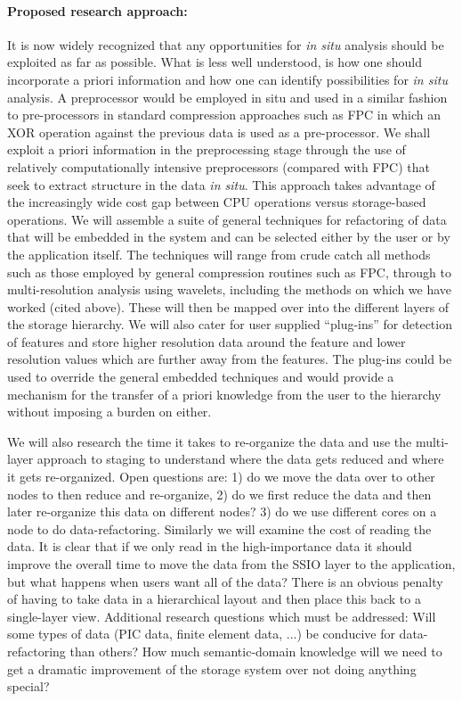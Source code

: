 \paragraph{Proposed research approach:} It is now widely recognized that any
opportunities for {\em in situ} analysis should be exploited as far as
possible. What is less well understood, is how one should incorporate a priori
information and how one can identify possibilities for {\em in situ} analysis.
A preprocessor would be employed in situ and used in a similar fashion to
pre-processors in standard compression approaches such as FPC
\cite{BurtscherFPC} in which an XOR operation against the previous data is used
as a pre-processor.  We shall exploit a priori information in the preprocessing
stage through the use of relatively computationally intensive preprocessors
(compared with FPC) that seek to extract structure in the data {\em in situ}.
This approach takes advantage of the increasingly wide cost gap between CPU
operations versus storage-based operations. 
We will assemble a suite of general techniques for refactoring of data that
will be embedded in the system and can be selected either by the user or by the
application itself. The techniques will range from crude catch all methods such
as those employed by general compression routines such as FPC, through to
multi-resolution analysis using wavelets, including the methods on which we
have worked (cited above).  These will then be mapped over into the different
layers of the storage hierarchy.  We will also cater for user supplied
``plug-ins'' for detection of features and store higher resolution data around
the feature and lower resolution values which are further away from the
features. The plug-ins could be used to override the general embedded
techniques and would provide a mechanism for the transfer of a priori knowledge
from the user to the hierarchy without imposing a burden on either. 

We will also research the time it takes to re-organize the data and use the
multi-layer approach to staging to understand where the data gets reduced and
where it gets re-organized. Open questions are: 1) do we move the data over to
other nodes to then reduce and re-organize, 2) do we first reduce the data and
then later re-organize this data on different nodes?  3) do we use different
cores on a node to do data-refactoring.  Similarly we will examine the cost of
reading the data. It is clear that if we only read in the high-importance data
it should improve the overall time to move the data from the SSIO layer to the
application, but what happens when users want all of the data? There is an
obvious penalty of having to take data in a hierarchical layout and then place
this back to a single-layer view.  Additional research questions which must be
addressed: Will some types of data (PIC data, finite element data, ...) be
conducive  for data-refactoring than others? How much semantic-domain knowledge
will we need to get a dramatic improvement of the storage system over not doing
anything special? 

